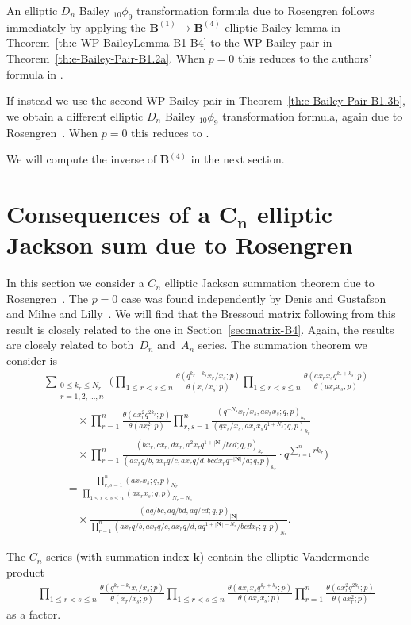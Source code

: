 \documentclass[pdftex]{sigma}
\numberwithin{equation}{section}
\newenvironment{Remark*}{\begin{remark*}\normalfont}{\end{remark*}}
\newcommand{\sumN}{{\left| \boldsymbol{N} \right|}}
\newcommand{\B}{{ \mathbf B}}
\renewcommand{\k}{{ \boldsymbol{k}}}
\newcommand{\multsum}[3]{{\sum\limits_{\substack{{0\le #1_#3 \le #2_#3} \\
{#3 =1,2,\dots, n}}}}}
\newcommand{\triprod}[1]{\prod\limits_{1\le r < s \le #1}}
\newcommand{\sqprod}[1]{\prod\limits_{r, s =1}^{#1}} %
\newcommand{\smallprod}[1]{\prod\limits_{r =1}^{#1}} %
\newcommand{\xover}[1]{#1_{r}/#1_{s}}
\newcommand{\ellipticqrfac}[2]{{\left({#1}; q, p\right)_{#2}}} %
\newcommand{\elliptictheta}[1]{\theta \left({#1} ; p\right) }
\newcommand{\ellipticvandermonde}[3]{\triprod{#3} %
\!\! \frac{\elliptictheta{q^{#2_r-#2_s} \xover {#1} }}{\elliptictheta{\xover{#1}}}
}
\begin{document}
An elliptic $D_n$ Bailey $_{10}\phi_9$ transformation formula due to Rosengren \cite[Corollary~8.5]{HR2004} follows immediately by applying the $\B^{(1)} \to\B^{(4)}$ elliptic Bailey lemma in Theorem~\ref{th:e-WP-BaileyLemma-B1-B4} to the WP Bailey pair in Theorem~\ref{th:e-Bailey-Pair-B1.2a}. When $p=0$ this reduces to the authors' formula in \cite[Theorem~3.13]{BS1998}.

If instead we use the second WP Bailey pair in Theorem~\ref{th:e-Bailey-Pair-B1.3b}, we obtain a different elliptic $D_n$ Bailey $_{10}\phi_9$ transformation formula, again due to Rosengren~\cite[Corollary~8.4]{HR2004}. When $p=0$ this reduces to \cite[Theorem~3.1]{BS1998}.

We will compute the inverse of $\B^{(4)}$ in the next section.

\section[Consequences of a $C_n$ elliptic Jackson sum due to Rosengren]{Consequences of a $\boldsymbol{C_n}$ elliptic Jackson sum due to Rosengren}\label{sec:cn-case}

In this section we consider a $C_n$ elliptic Jackson summation theorem due to Rosengren~\cite[Theorem~7.1]{HR2004}. The $p=0$ case
was found independently by Denis and Gustafson~\cite[Theorem~4.1]{DG1992} and Milne and Lilly~\cite[Theorem~6.13]{ML1995}. We will find that the Bressoud matrix following from this result is closely related to the one in Section~\ref{sec:matrix-B4}. Again, the results are closely related to both~$D_n$ and~$A_n$ series. The summation theorem we consider is
\begin{gather}
\multsum{k}{N}{r} \Bigg(\ellipticvandermonde{x}{k}{n}
\triprod n \frac{\elliptictheta{ ax_rx_sq^{k_r+k_s}} }{\elliptictheta{ax_rx_s}}\nonumber\\
\qquad\quad{} \times \smallprod n \frac{\elliptictheta{ax_r^2q^{2k_r}}}{\elliptictheta{ax_r^2}}
 \sqprod n \frac{\ellipticqrfac{q^{-N_s}\xover{x}, ax_rx_s}{k_r} }
 {\ellipticqrfac{q\xover{x}, ax_rx_sq^{1+N_s}}{k_r} } \nonumber\\
\qquad\quad{} \times
\smallprod n \frac{\ellipticqrfac{bx_r, cx_r, dx_r, a^2x_rq^{1+\sumN}/bcd}{k_r}}
{\ellipticqrfac{ax_rq/b, ax_rq/c, ax_rq/d, bcdx_rq^{-\sumN}/a}{k_r}}
\cdot q^{\sum\limits_{r=1}^n r k_r}\Bigg)\nonumber\\
\qquad{} =
\frac{\sqprod n \ellipticqrfac{ax_rx_s}{N_r} }
{\triprod n \ellipticqrfac{ax_rx_s}{N_r+N_s} } \nonumber\\
\qquad\quad\times
\frac{\ellipticqrfac{aq/bc, aq/bd, aq/cd}{\sumN}}
{ \smallprod n \ellipticqrfac{ax_rq/b, ax_rq/c, ax_rq/d, aq^{1+\sumN-N_r}/bcdx_r}{N_r}}.\label{e-8p7-2}
\end{gather}
\begin{Remark*} The
$C_n$ series (with summation index $\k$) contain the elliptic Vandermonde product
\begin{gather*}
\ellipticvandermonde{x}{k}{n}
\triprod n \frac{\elliptictheta{ ax_rx_sq^{k_r+k_s}} }{\elliptictheta{ax_rx_s}}
 \smallprod n \frac{\elliptictheta{ax_r^2q^{2k_r}}}{\elliptictheta{ax_r^2}}
\end{gather*}
as a factor.
\end{Remark*}
\end{document}

